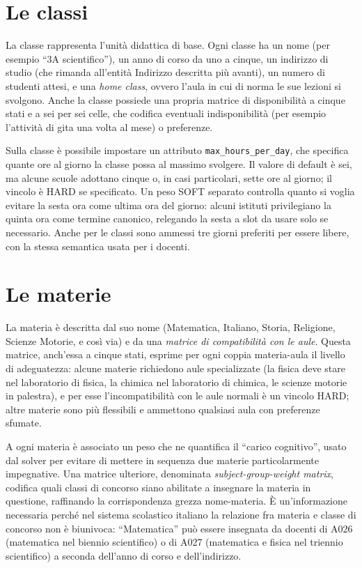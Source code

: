 \section{Le classi}

La classe rappresenta l'unit\`a didattica di base. Ogni
classe ha un nome (per esempio ``3A scientifico''), un anno
di corso da uno a cinque, un indirizzo di studio (che
rimanda all'entit\`a Indirizzo descritta pi\`u avanti), un
numero di studenti attesi, e una \emph{home class},
ovvero l'aula in cui di norma le sue lezioni si svolgono.
Anche la classe possiede una propria matrice di
disponibilit\`a a cinque stati e a sei per sei celle, che
codifica eventuali indisponibilit\`a (per esempio l'attivit\`a
di gita una volta al mese) o preferenze.

Sulla classe \`e possibile impostare un attributo
\texttt{max\_hours\_per\_day}, che specifica quante ore al
giorno la classe possa al massimo svolgere. Il valore di
default \`e sei, ma alcune scuole adottano cinque o, in casi
particolari, sette ore al giorno; il vincolo \`e HARD se
specificato. Un peso SOFT separato controlla quanto si
voglia evitare la sesta ora come ultima ora del giorno: alcuni
istituti privilegiano la quinta ora come termine canonico,
relegando la sesta a slot da usare solo se necessario. Anche
per le classi sono ammessi tre giorni preferiti per essere
libere, con la stessa semantica usata per i docenti.

\section{Le materie}

La materia \`e descritta dal suo nome (Matematica, Italiano,
Storia, Religione, Scienze Motorie, e cos\`i via) e da una
\emph{matrice di compatibilit\`a con le aule}. Questa
matrice, anch'essa a cinque stati, esprime per ogni coppia
materia-aula il livello di adeguatezza: alcune materie
richiedono aule specializzate (la fisica deve stare nel
laboratorio di fisica, la chimica nel laboratorio di
chimica, le scienze motorie in palestra), e per esse
l'incompatibilit\`a con le aule normali \`e un vincolo HARD;
altre materie sono pi\`u flessibili e ammettono qualsiasi
aula con preferenze sfumate.

A ogni materia \`e associato un peso che ne quantifica il
``carico cognitivo'', usato dal solver per evitare di
mettere in sequenza due materie particolarmente impegnative.
Una matrice ulteriore, denominata \emph{subject-group-weight
matrix}, codifica quali classi di concorso siano abilitate
a insegnare la materia in questione, raffinando la
corrispondenza grezza nome-materia. \`E un'informazione
necessaria perch\'e nel sistema scolastico italiano la
relazione fra materia e classe di concorso non \`e biunivoca:
``Matematica'' pu\`o essere insegnata da docenti di A026
(matematica nel biennio scientifico) o di A027 (matematica e
fisica nel triennio scientifico) a seconda dell'anno di
corso e dell'indirizzo.

